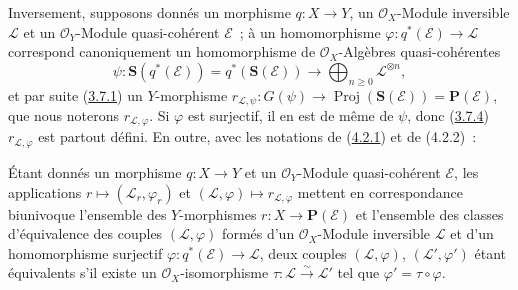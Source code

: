\begin{env}[4.2.2]
\label{II.4.2.2-fr}
Inversement, supposons donnés un morphisme $q:X\to Y$, un
$\mathcal{O}_X$-Module inversible $\mathcal{L}$ et un
$\mathcal{O}_Y$-Module quasi-cohérent $\mathcal{E}$~; à un homomorphisme
$\varphi:q^*(\mathcal{E})\to\mathcal{L}$ correspond canoniquement un
homomorphisme de $\mathcal{O}_X$-Algèbres quasi-cohérentes
\[
  \psi:\mathbf{S}(q^*(\mathcal{E}))=q^*(\mathbf{S}(\mathcal{E}))
  \longrightarrow\bigoplus_{n\geq0}\mathcal{L}^{\otimes n},
\]
et par suite (\hyperref[II.3.7.1-fr]{3.7.1}) un $Y$-morphisme
$r_{\mathcal{L},\psi}:G(\psi)\to
\operatorname{Proj}(\mathbf{S}(\mathcal{E}))=\mathbf{P}(\mathcal{E})$, que
nous noterons $r_{\mathcal{L},\varphi}$. Si $\varphi$ est surjectif, il en est
de même de $\psi$, donc (\hyperref[II.3.7.4-fr]{3.7.4})
$r_{\mathcal{L},\varphi}$ est partout défini. En outre, avec les notations de
(\hyperref[II.4.2.1-fr]{4.2.1}) et de (4.2.2)~:
\end{env}

\begin{proposition}[4.2.3]
\label{II.4.2.3-fr}
Étant donnés un morphisme $q:X\to Y$ et un $\mathcal{O}_Y$-Module
quasi-cohérent $\mathcal{E}$, les applications
$r\mapsto(\mathcal{L}_r,\varphi_r)$ et
$(\mathcal{L},\varphi)\mapsto r_{\mathcal{L},\varphi}$ mettent en
correspondance biunivoque l'ensemble des $Y$-morphismes
$r:X\to\mathbf{P}(\mathcal{E})$ et l'ensemble des classes d'équivalence des
couples $(\mathcal{L},\varphi)$ formés d'un $\mathcal{O}_X$-Module inversible
$\mathcal{L}$ et d'un homomorphisme surjectif
$\varphi:q^*(\mathcal{E})\to\mathcal{L}$, deux couples
$(\mathcal{L},\varphi)$, $(\mathcal{L}',\varphi')$ étant équivalents s'il
existe un $\mathcal{O}_X$-isomorphisme
$\tau:\mathcal{L}\xrightarrow{\sim}\mathcal{L}'$ tel que
$\varphi'=\tau\circ\varphi$.
\end{proposition}

